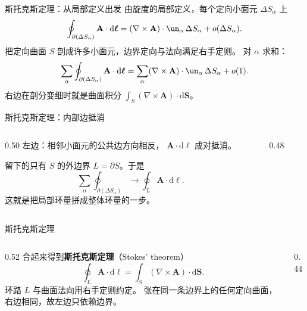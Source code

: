 \documentclass[fontset=windows, chinese, 10pt, xcolor=dvipsnames]{beamer}
\begin{document}
\begin{frame}{斯托克斯定理：从局部定义出发}
  由旋度的局部定义，每个定向小面元 $\Delta S_\alpha$ 上
  \begin{equation*}
    \oint_{\partial(\Delta S_\alpha)}\mathbf{A}\cdot\mathrm{d}\boldsymbol{\ell}
    =(\nabla\times\mathbf{A})\cdot\un_\alpha\,\Delta S_\alpha
      +o(\Delta S_\alpha).
  \end{equation*}
  把定向曲面 $S$ 剖成许多小面元，边界定向与法向满足右手定则。
  对 $\alpha$ 求和：
  \begin{equation*}
    \sum_\alpha\oint_{\partial(\Delta S_\alpha)}\mathbf{A}\cdot\mathrm{d}\boldsymbol{\ell}
    =\sum_\alpha(\nabla\times\mathbf{A})\cdot\un_\alpha\,\Delta S_\alpha
      +o(1).
  \end{equation*}
  右边在剖分变细时就是曲面积分
  $\displaystyle\int_S(\nabla\times\mathbf{A})\cdot\mathrm{d}\mathbf{S}$。
\end{frame}

\begin{frame}{斯托克斯定理：内部边抵消}
  \begin{columns}[c]
    \begin{column}{0.50\textwidth}
      左边：相邻小面元的公共边方向相反，
      $\mathbf{A}\cdot\mathrm{d}\boldsymbol{\ell}$ 成对抵消。
      \vspace{0.3em}

      留下的只有 $S$ 的外边界 $L=\partial S$。于是
      \begin{equation*}
        \sum_\alpha\oint_{\partial(\Delta S_\alpha)}
        \longrightarrow
        \oint_L\mathbf{A}\cdot\mathrm{d}\boldsymbol{\ell}.
      \end{equation*}
      这就是把局部环量拼成整体环量的一步。
    \end{column}
    \begin{column}{0.48\textwidth}
      \centering
      \resizebox{\linewidth}{!}{}
    \end{column}
  \end{columns}
\end{frame}

\begin{frame}{斯托克斯定理}
  \begin{columns}[c]
    \begin{column}{0.52\textwidth}
      合起来得到\textbf{斯托克斯定理}（Stokes' theorem）
      \begin{equation*}
        \boxed{\displaystyle
          \oint_L\mathbf{A}\cdot\mathrm{d}\boldsymbol{\ell}
          =\int_S(\nabla\times\mathbf{A})\cdot\mathrm{d}\mathbf{S}.}
      \end{equation*}
      环路 $L$ 与曲面法向用右手定则约定。
      张在同一条边界上的任何定向曲面，右边相同，故左边只依赖边界。
    \end{column}
    \begin{column}{0.44\textwidth}
      \centering
      \scalebox{0.82}{}
    \end{column}
  \end{columns}
\end{frame}
\end{document}
